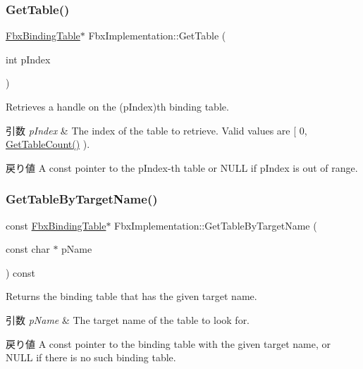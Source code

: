 \subsubsection{\texorpdfstring{Get\+Table()}{GetTable()}\hspace{0.1cm}{\footnotesize\ttfamily [2/2]}}
{\footnotesize\ttfamily \hyperlink{class_fbx_binding_table}{Fbx\+Binding\+Table}$\ast$ Fbx\+Implementation\+::\+Get\+Table (\begin{DoxyParamCaption}\item[{int}]{p\+Index }\end{DoxyParamCaption})}

Retrieves a handle on the (p\+Index)th binding table. 
\begin{DoxyParams}{引数}
{\em p\+Index} & The index of the table to retrieve. Valid values are \mbox{[} 0, \hyperlink{class_fbx_implementation_a36f67aeee13d4cc5d1523b9c36a44a50}{Get\+Table\+Count()} ). \\
\hline
\end{DoxyParams}
\begin{DoxyReturn}{戻り値}
A const pointer to the p\+Index-\/th table or N\+U\+LL if p\+Index is out of range. 
\end{DoxyReturn}
\mbox{\label{class_fbx_implementation_a45821c1d329404af513665d9809bab69}} 
\subsubsection{\texorpdfstring{Get\+Table\+By\+Target\+Name()}{GetTableByTargetName()}\hspace{0.1cm}{\footnotesize\ttfamily [1/2]}}
{\footnotesize\ttfamily const \hyperlink{class_fbx_binding_table}{Fbx\+Binding\+Table}$\ast$ Fbx\+Implementation\+::\+Get\+Table\+By\+Target\+Name (\begin{DoxyParamCaption}\item[{const char $\ast$}]{p\+Name }\end{DoxyParamCaption}) const}

Returns the binding table that has the given target name. 
\begin{DoxyParams}{引数}
{\em p\+Name} & The target name of the table to look for. \\
\hline
\end{DoxyParams}
\begin{DoxyReturn}{戻り値}
A const pointer to the binding table with the given target name, or N\+U\+LL if there is no such binding table. 
\end{DoxyReturn}
\mbox{\label{class_fbx_implementation_af50ff5315cb37e8e8ac0f8fb2b145e2e}} 
